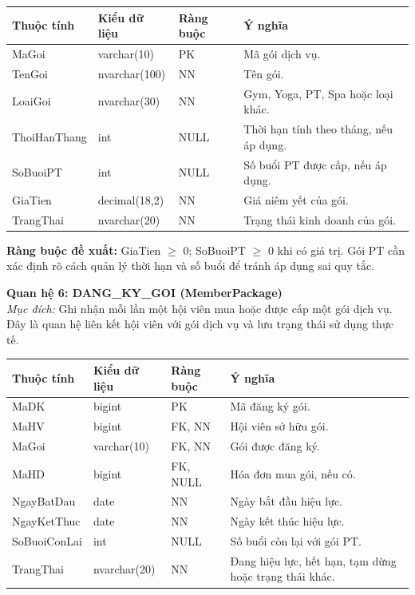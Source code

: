 \documentclass[11pt, a4paper]{article}
\begin{document}
\begin{small}
\begin{tabularx}{\textwidth}{| C{2.8cm} | C{2.4cm} | C{2cm} | Y |}
\hline
\textbf{Thuộc tính} & \textbf{Kiểu dữ liệu} & \textbf{Ràng buộc} & \textbf{Ý nghĩa} \\
\hline
MaGoi & varchar(10) & PK & Mã gói dịch vụ. \\
\hline
TenGoi & nvarchar(100) & NN & Tên gói. \\
\hline
LoaiGoi & nvarchar(30) & NN & Gym, Yoga, PT, Spa hoặc loại khác. \\
\hline
ThoiHanThang & int & NULL & Thời hạn tính theo tháng, nếu áp dụng. \\
\hline
SoBuoiPT & int & NULL & Số buổi PT được cấp, nếu áp dụng. \\
\hline
GiaTien & decimal(18,2) & NN & Giá niêm yết của gói. \\
\hline
TrangThai & nvarchar(20) & NN & Trạng thái kinh doanh của gói. \\
\hline
\end{tabularx}
\end{small}

\textbf{Ràng buộc đề xuất:} GiaTien $\ge$ 0; SoBuoiPT $\ge$ 0 khi có giá trị. Gói PT cần xác định rõ cách quản lý thời hạn và số buổi để tránh áp dụng sai quy tắc.

\vspace{0.8em}
\textbf{Quan hệ 6: DANG\_KY\_GOI (MemberPackage)} \\
\textit{Mục đích:} Ghi nhận mỗi lần một hội viên mua hoặc được cấp một gói dịch vụ. Đây là quan hệ liên kết hội viên với gói dịch vụ và lưu trạng thái sử dụng thực tế.

\begin{small}
\begin{tabularx}{\textwidth}{| C{2.8cm} | C{2.4cm} | C{2.2cm} | Y |}
\hline
\textbf{Thuộc tính} & \textbf{Kiểu dữ liệu} & \textbf{Ràng buộc} & \textbf{Ý nghĩa} \\
\hline
MaDK & bigint & PK & Mã đăng ký gói. \\
\hline
MaHV & bigint & FK, NN & Hội viên sở hữu gói. \\
\hline
MaGoi & varchar(10) & FK, NN & Gói được đăng ký. \\
\hline
MaHD & bigint & FK, NULL & Hóa đơn mua gói, nếu có. \\
\hline
NgayBatDau & date & NN & Ngày bắt đầu hiệu lực. \\
\hline
NgayKetThuc & date & NN & Ngày kết thúc hiệu lực. \\
\hline
SoBuoiConLai & int & NULL & Số buổi còn lại với gói PT. \\
\hline
TrangThai & nvarchar(20) & NN & Đang hiệu lực, hết hạn, tạm dừng hoặc trạng thái khác. \\
\hline
\end{tabularx}
\end{small}
\end{document}
